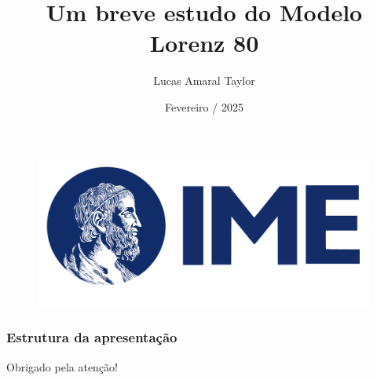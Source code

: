 \documentclass[
    11pt,               %
    aspectratio=169,   %
]{beamer}
\title[Lorenz 80]{Um breve estudo do Modelo Lorenz 80}
\author[TAYLOR, Lucas A.]{Lucas Amaral Taylor}
\institute[IME-USP]{Instituto de Matemática e Estatística \\ (IME-USP)}
\date[2025]{Fevereiro / 2025}
\begin{document}
\begin{frame}
    \begin{figure}
        \includegraphics[width=0.4\linewidth]{img/logo_IME.png}
    \end{figure}
    \titlepage
\end{frame}

\begin{frame}
    \frametitle{Estrutura da apresentação}
    \tableofcontents
\end{frame}








\begin{frame}
    \begin{center}
        {\Huge Obrigado pela atenção!}
    \end{center}
\end{frame}
\end{document}
